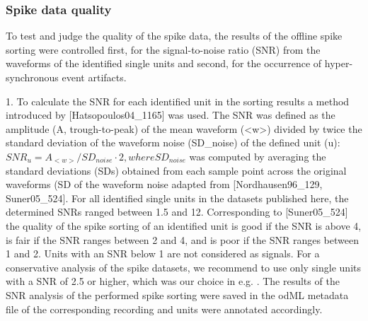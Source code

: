 \subsubsection{Spike data quality}

To test and judge the quality of the spike data, the results of the offline spike sorting were controlled first, for the signal-to-noise ratio (SNR) from the waveforms of the identified single units and second, for the occurrence of hyper-synchronous event artifacts.

1. To calculate the SNR for each identified unit in the sorting results a method introduced by [Hatsopoulos04\_1165] was used. The SNR was defined as the amplitude (A, trough-to-peak) of the mean waveform (<w>) divided by twice the standard deviation of the waveform noise (SD\_{noise}) of the defined unit (u): $SNR_{u}=A_{<w>}/SD_{noise}\cdot2,where SD_{noise}$ was computed by averaging the standard deviations (SDs) obtained from each sample point across the original waveforms (SD of the waveform noise adapted from [Nordhausen96\_129, Suner05\_524]. For all identified single units in the datasets published here, the determined SNRs ranged between 1.5 and 12. Corresponding to [Suner05\_524] the quality of the spike sorting of an identified unit is good if the SNR is above 4, is fair if the SNR ranges between 2 and 4, and is poor if the SNR ranges between 1 and 2. Units with an SNR below 1 are not considered as signals. For a conservative analysis of the spike datasets, we recommend to use only single units with a SNR of 2.5 or higher, which was our choice in e.g. . The results of the SNR analysis of the performed spike sorting were saved in the odML metadata file of the corresponding recording and units were annotated accordingly. 

